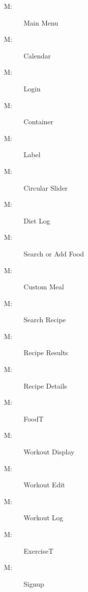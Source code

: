 \documentclass[12pt, titlepage]{article}
\newcounter{mnum}
\newcommand{\mthemnum}{M\themnum}
\begin{document}
\begin{description}
	\item [ \mthemnum \label{m1}:] Main Menu
	\item [ \mthemnum \label{m2}:] Calendar
	\item [ \mthemnum \label{m3}:] Login
	\item [ \mthemnum \label{m4}:] Container
	\item [ \mthemnum \label{m5}:] Label
	\item [ \mthemnum \label{m6}:] Circular Slider
	\item [ \mthemnum \label{m7}:] Diet Log
	\item [ \mthemnum \label{m8}:] Search or Add Food
	\item [ \mthemnum \label{m9}:] Custom Meal
	\item [ \mthemnum \label{m10}:] Search Recipe
	\item [ \mthemnum \label{m11}:] Recipe Results
	\item [ \mthemnum \label{m12}:] Recipe Details
	\item [ \mthemnum \label{m13}:] FoodT
	\item [ \mthemnum \label{m14}:] Workout Display
	\item [ \mthemnum \label{m15}:] Workout Edit
	\item [ \mthemnum \label{m16}:] Workout Log
	\item [ \mthemnum \label{m17}:] ExerciseT
	\item [ \mthemnum \label{m18}:] Signup
\end{description}
\end{document}
